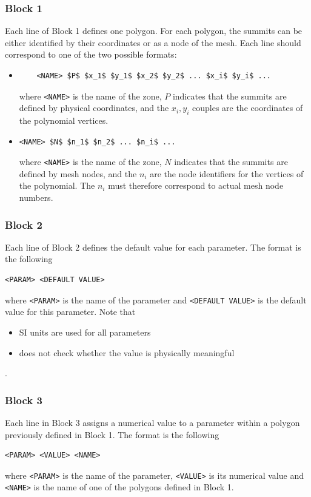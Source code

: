 \subsubsection{Block 1}
Each line of Block 1 defines one polygon. For each polygon, the summits can be either identified by their coordinates or as a node of the mesh. Each line should correspond to one of the two possible formats:
\begin{itemize}
    \item 
    \begin{lstlisting}
    <NAME> $P$ $x_1$ $y_1$ $x_2$ $y_2$ ... $x_i$ $y_i$ ... \end{lstlisting}
where \texttt{<NAME>} is the name of the zone, $P$ indicates that the summits are defined by physical coordinates, and the $x_i,y_i$ couples are the coordinates of the polynomial vertices.
    \item 
        \begin{lstlisting}
<NAME> $N$ $n_1$ $n_2$ ... $n_i$ ...
\end{lstlisting}
where \texttt{<NAME>} is the name of the zone, $N$ indicates that the summits are defined by mesh nodes, and the $n_i$ are the node identifiers for the vertices of the polynomial. The $n_i$ must therefore correspond to actual mesh node numbers.
\end{itemize}


\subsubsection{Block 2}
Each line of Block 2 defines the default value for each parameter. The format is the following
\begin{lstlisting}
<PARAM> <DEFAULT VALUE>
\end{lstlisting}
where \texttt{<PARAM>} is the name of the parameter and \texttt{<DEFAULT VALUE>} is the default value for this parameter. Note that
\begin{itemize}
\item SI units are used for all parameters
\item \swZone does not check whether the value is physically meaningful
\end{itemize}. 

\subsubsection{Block 3}
Each line in Block 3 assigns a numerical value to a parameter within a polygon previously defined in Block 1. The format is the following
\begin{lstlisting}
<PARAM> <VALUE> <NAME>
\end{lstlisting}
where \texttt{<PARAM>} is the name of the parameter, \texttt{<VALUE>} is its numerical value and \texttt{<NAME>} is the name of one of the polygons defined in Block 1. 

